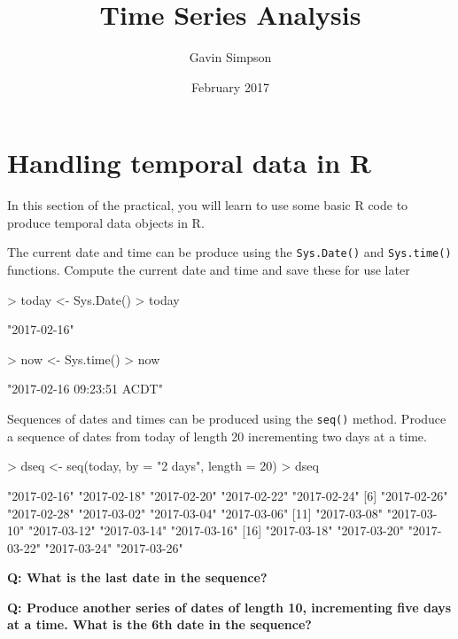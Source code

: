 \documentclass[a4paper,10pt]{article}
\begin{document}
\title{Time Series Analysis}
\author{Gavin Simpson}
\date{February 2017}

\maketitle

\section{Handling temporal data in R}
In this section of the practical, you will learn to use some basic R code to produce temporal data objects in R.

The current date and time can be produce using the \texttt{Sys.Date()} and \texttt{Sys.time()} functions. Compute the current date and time and save these for use later
\begin{Schunk}
\begin{Sinput}
> today <- Sys.Date()
> today
\end{Sinput}
\begin{Soutput}
[1] "2017-02-16"
\end{Soutput}
\begin{Sinput}
> now <- Sys.time()
> now
\end{Sinput}
\begin{Soutput}
[1] "2017-02-16 09:23:51 ACDT"
\end{Soutput}
\end{Schunk}

Sequences of dates and times can be produced using the \texttt{seq()} method. Produce a sequence of dates from today of length 20 incrementing two days at a time.
\begin{Schunk}
\begin{Sinput}
> dseq <- seq(today, by = "2 days", length = 20)
> dseq
\end{Sinput}
\begin{Soutput}
 [1] "2017-02-16" "2017-02-18" "2017-02-20" "2017-02-22" "2017-02-24"
 [6] "2017-02-26" "2017-02-28" "2017-03-02" "2017-03-04" "2017-03-06"
[11] "2017-03-08" "2017-03-10" "2017-03-12" "2017-03-14" "2017-03-16"
[16] "2017-03-18" "2017-03-20" "2017-03-22" "2017-03-24" "2017-03-26"
\end{Soutput}
\end{Schunk}

\textbf{Q: What is the last date in the sequence?}

\textbf{Q: Produce another series of dates of length 10, incrementing five days at a time. What is the 6th date in the sequence?}
\end{document}
